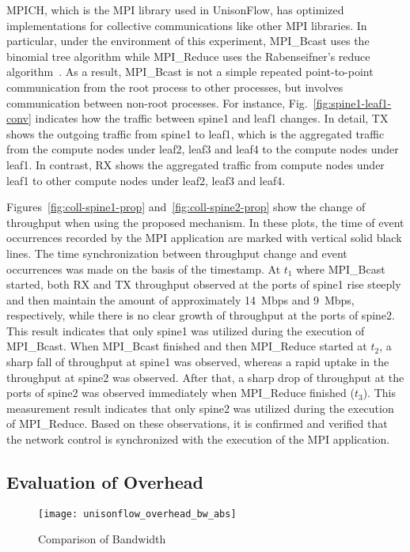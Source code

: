 MPICH, which is the MPI library used in UnisonFlow, has optimized
implementations for collective communications like other MPI libraries.
In particular, under the environment of this experiment, MPI\_Bcast uses
the binomial tree algorithm while MPI\_Reduce uses the Rabenseifner's reduce
algorithm~\autocite{Rabenseifner2004}. As a result, MPI\_Bcast is not a
simple repeated point-to-point communication from the root process to
other processes, but involves communication between non-root processes.
For instance, Fig.~\ref{fig:spine1-leaf1-conv} indicates how the traffic
between spine1 and leaf1 changes. In detail, TX shows the outgoing
traffic from spine1 to leaf1, which is the aggregated traffic from the
compute nodes under leaf2, leaf3 and leaf4 to the compute nodes
under leaf1. In contrast, RX shows the aggregated traffic from compute
nodes under leaf1 to other compute nodes under leaf2, leaf3 and leaf4.

Figures~\ref{fig:coll-spine1-prop} and~\ref{fig:coll-spine2-prop} show
the change of throughput when using the proposed mechanism. In these
plots, the time of event occurrences recorded by the MPI application are
marked with vertical solid black lines. The time synchronization between
throughput change and event occurrences was made on the basis of the
timestamp. At \(t_1\) where MPI\_Bcast started, both RX and TX
throughput observed at the ports of spine1 rise steeply and then
maintain the amount of approximately 14~Mbps and 9~Mbps, respectively,
while there is no clear growth of throughput at the ports of spine2.
This result indicates that only spine1 was utilized during the execution of
MPI\_Bcast. When MPI\_Bcast finished and then MPI\_Reduce started at
\(t_2\), a sharp fall of throughput at spine1 was observed, whereas a
rapid uptake in the throughput at spine2 was observed. After that, a
sharp drop of throughput at the ports of spine2 was observed immediately
when MPI\_Reduce finished (\(t_3\)). This measurement result indicates
that only spine2 was utilized during the execution of MPI\_Reduce. Based
on these observations, it is confirmed and verified that the network
control is synchronized with the execution of the MPI application.

\subsection{Evaluation of Overhead}

\begin{figure}
    \centering
    \texttt{[image: unisonflow\_overhead\_bw\_abs]}
    \caption{Comparison of Bandwidth}%
    \label{fig:overhead-bandwidth}
\end{figure}


